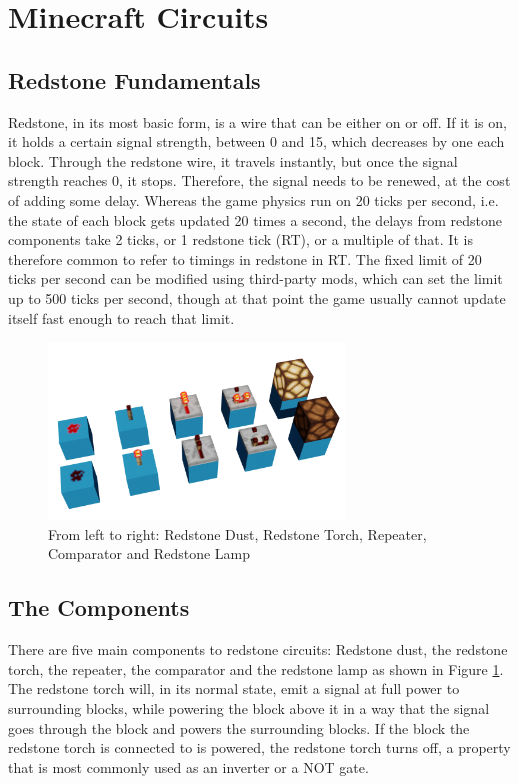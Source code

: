 
\section{Minecraft Circuits} \label{ssec::MinecraftCircuits}

\subsection{Redstone Fundamentals}
Redstone, in its most basic form, is a wire that can be either on or off. If it is on, it holds a certain signal strength, between 0 and 15, which decreases by one each block. Through the redstone wire, it travels instantly, but once the signal strength reaches 0, it stops. Therefore, the signal needs to be renewed, at the cost of adding some delay. Whereas the game physics run on 20 ticks per second, i.e. the state of each block gets updated 20 times a second, the delays from redstone components take 2 ticks, or 1 redstone tick (RT), or a multiple of that. It is therefore common to refer to timings in redstone in RT. The fixed limit of 20 ticks per second can be modified using third-party mods, which can set the limit up to 500 ticks per second, though at that point the game usually cannot update itself fast enough to reach that limit.

\begin{figure}[!ht]
    \begin{center}
        \includegraphics[width=0.7\textwidth]{Figures/Components-small.png}
        \caption[Five basic components]{From left to right: Redstone Dust, Redstone Torch, Repeater, Comparator and Redstone Lamp}
        \label{fig::RedstoneComponents}
    \end{center}
\end{figure}

\subsection{The Components} \label{ssec::Components}
There are five main components to redstone circuits: Redstone dust, the redstone torch, the repeater, the comparator and the redstone lamp as shown in Figure \ref{fig::RedstoneComponents}. The redstone torch will, in its normal state, emit a signal at full power to surrounding blocks, while powering the block above it in a way that the signal goes through the block and powers the surrounding blocks. If the block the redstone torch is connected to is powered, the redstone torch turns off, a property that is most commonly used as an inverter or a NOT gate.

